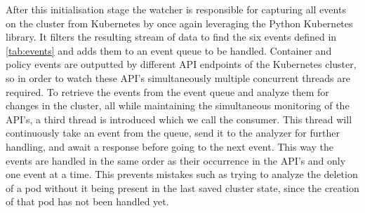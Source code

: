 After this initialisation stage the watcher is responsible for capturing all events on the cluster from Kubernetes by once again leveraging the Python Kubernetes library. It filters the resulting stream of data to find the six events defined in \autoref{tab:events} and adds them to an event queue to be handled. Container and policy events are outputted by different API endpoints of the Kubernetes cluster, so in order to watch these API's simultaneously multiple concurrent threads are required. To retrieve the events from the event queue and analyze them for changes in the cluster, all while maintaining the simultaneous monitoring of the API's, a third thread is introduced which we call the consumer. This thread will continuously take an event from the queue, send it to the analyzer for further handling, and await a response before going to the next event. This way the events are handled in the same order as their occurrence in the API's and only one event at a time. This prevents mistakes such as trying to analyze the deletion of a pod without it being present in the last saved cluster state, since the creation of that pod has not been handled yet. 
\\[10pt]
